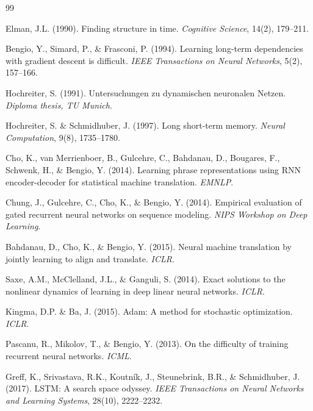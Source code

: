 \documentclass[12pt, a4paper]{article}
\begin{document}
\newpage
\begin{thebibliography}{99}

Elman, J.L. (1990). Finding structure in time. \textit{Cognitive Science}, 14(2), 179--211.

Bengio, Y., Simard, P., \& Frasconi, P. (1994). Learning long-term dependencies with gradient descent is difficult. \textit{IEEE Transactions on Neural Networks}, 5(2), 157--166.

Hochreiter, S. (1991). Untersuchungen zu dynamischen neuronalen Netzen. \textit{Diploma thesis, TU Munich}.

Hochreiter, S. \& Schmidhuber, J. (1997). Long short-term memory. \textit{Neural Computation}, 9(8), 1735--1780.

Cho, K., van Merrienboer, B., Gulcehre, C., Bahdanau, D., Bougares, F., Schwenk, H., \& Bengio, Y. (2014). Learning phrase representations using RNN encoder-decoder for statistical machine translation. \textit{EMNLP}.

Chung, J., Gulcehre, C., Cho, K., \& Bengio, Y. (2014). Empirical evaluation of gated recurrent neural networks on sequence modeling. \textit{NIPS Workshop on Deep Learning}.

Bahdanau, D., Cho, K., \& Bengio, Y. (2015). Neural machine translation by jointly learning to align and translate. \textit{ICLR}.

Saxe, A.M., McClelland, J.L., \& Ganguli, S. (2014). Exact solutions to the nonlinear dynamics of learning in deep linear neural networks. \textit{ICLR}.

Kingma, D.P. \& Ba, J. (2015). Adam: A method for stochastic optimization. \textit{ICLR}.

Pascanu, R., Mikolov, T., \& Bengio, Y. (2013). On the difficulty of training recurrent neural networks. \textit{ICML}.

Greff, K., Srivastava, R.K., Koutn\'{i}k, J., Steunebrink, B.R., \& Schmidhuber, J. (2017). LSTM: A search space odyssey. \textit{IEEE Transactions on Neural Networks and Learning Systems}, 28(10), 2222--2232.

\end{thebibliography}
\end{document}
